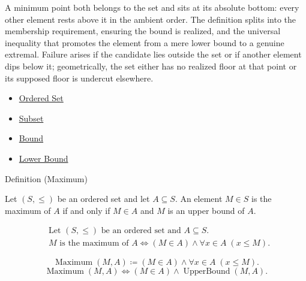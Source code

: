 \begin{remark*}[Interpretation]
A minimum point both belongs to the set and sits at its absolute bottom: every other element rests above it in the ambient order. The definition splits into the membership requirement, ensuring the bound is realized, and the universal inequality that promotes the element from a mere lower bound to a genuine extremal. Failure arises if the candidate lies outside the set or if another element dips below it; geometrically, the set either has no realized floor at that point or its supposed floor is undercut elsewhere.
\end{remark*}

\begin{dependencies}
\begin{itemize}
  \item \hyperref[def:ordered-set]{Ordered Set}
  \item \hyperref[def:subset]{Subset}
  \item \hyperref[def:bound]{Bound}
  \item \hyperref[def:lower-bound]{Lower Bound}
\end{itemize}
\end{dependencies}

\begin{definitionbox}{Definition (Maximum)}
\begin{definition}[Maximum]
\label{def:maximum}
Let $(S,\le)$ be an ordered set and let $A \subseteq S$. An element $M \in S$ is the maximum of $A$ if and only if $M \in A$ and $M$ is an upper bound of $A$.
\end{definition}
\end{definitionbox}

\begin{remark*}
\[
\begin{aligned}
&\text{Let } (S,\le) \text{ be an ordered set and } A \subseteq S.\\
&M \text{ is the maximum of } A
\Longleftrightarrow
(M \in A) \land \forall x \in A\;(x \le M).
\end{aligned}
\]
\end{remark*}

\begin{remark*}
\[
\operatorname{Maximum}(M,A) \coloneqq (M \in A) \land \forall x \in A\;(x \le M).
\]
\[
\operatorname{Maximum}(M,A)\Longleftrightarrow (M\in A)\land \operatorname{UpperBound}(M,A).
\]
\end{remark*}

